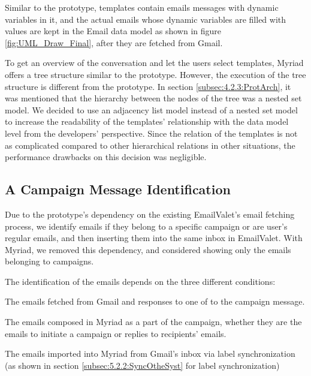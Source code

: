 Similar to the prototype, templates contain emails messages with dynamic variables in it, and the actual emails whose dynamic variables are filled with values are kept in the Email data model as shown in figure \ref{fig:UML_Draw_Final}, after they are fetched from Gmail.
\vspace{1cm}

To get an overview of the conversation and let the users select templates, Myriad offers a tree structure similar to the prototype. However, the execution of the tree structure is different from the prototype. In section \ref{subsec:4.2.3:ProtArch}, it was mentioned that the hierarchy between the nodes of the tree was a nested set model. We decided to use an adjacency list model instead of a nested set model to increase the readability of the templates' relationship with the data model level from the developers' perspective. Since the relation of the templates is not as complicated compared to other hierarchical relations in other situations, the performance drawbacks on this decision was negligible.

\subsection{A Campaign Message Identification}
\label{subsec:5.3.3:MessIden}

Due to the prototype's dependency on the existing EmailValet's email fetching process, we identify emails if they belong to a specific campaign or are user's regular emails, and then inserting them into the same inbox in EmailValet. With Myriad, we removed this dependency, and considered showing only the emails belonging to campaigns.
\vspace{1cm}

The identification of the emails depends on the three different conditions:

\begin{compactenum}
	\item The emails fetched from Gmail and responses to one of to the campaign message.
	\item The emails composed in Myriad as a part of the campaign, whether they are the emails to initiate a campaign or replies to recipients' emails.
	\item The emails imported into Myriad from Gmail's inbox via label synchronization (as shown in section \ref{subsec:5.2.2:SyncOtheSyst} for label synchronization)
\end{compactenum}
\vspace{1cm}

